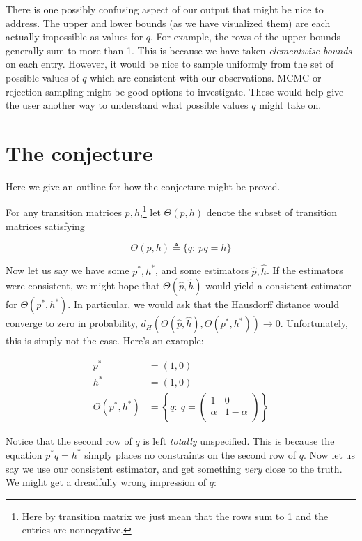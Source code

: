 There is one possibly confusing aspect of our output that might be nice to address.  The upper and lower bounds (as we have visualized them) are each actually impossible as values for $q$.  For example, the rows of the upper bounds generally sum to more than 1.  This is because we have taken \emph{elementwise bounds} on each entry.  However, it would be nice to sample uniformly from the set of possible values of $q$ which are consistent with our observations.  MCMC or rejection sampling might be good options to investigate.  These would help give the user another way to understand what possible values $q$ might take on.  

\section{The conjecture}

Here we give an outline for how the conjecture might be proved.

For any transition matrices $p,h$,\footnote{Here by transition matrix we just mean that the rows sum to 1 and the entries are nonnegative.} let $\Theta(p,h)$ denote the subset of transition matrices satisfying

\[
\Theta(p,h) \triangleq \{q:\ pq=h\}
\]

Now let us say we have some $p^*,h^*$, and some estimators $\hat p,\hat h$.  If the estimators were consistent, we might hope that $\Theta(\hat p,\hat h)$ would yield a consistent estimator for $\Theta(p^*,h^*)$.  In particular, we would ask that the Hausdorff distance would converge to zero in probability, $d_H(\Theta(\hat p,\hat h),\Theta(p^*,h^*))\rightarrow 0$.  Unfortunately, this is simply not the case.  Here's an example:

\begin{align*}
p^* &= (1, 0)\\
h^* &= (1, 0)\\
\Theta(p^*,h^*) &= 
  \left\{q:\ q=\left(\begin{array}{cc}
  1 & 0 \\
  \alpha & 1-\alpha \\
  \end{array}\right)\right\}
\end{align*}

Notice that the second row of $q$ is left \emph{totally} unspecified.  This is because the equation $p^*q=h^*$ simply places no constraints on the second row of $q$.  Now let us say we use our consistent estimator, and get something \emph{very} close to the truth.  We might get a dreadfully wrong impression of $q$:

